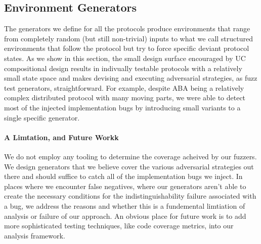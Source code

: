 \subsection{Environment Generators}
The generators we define for all the protocols produce environments that range
from completely random (but still non-trivial) inputs to what we call
structured environments that follow the protocol but try to force specific
deviant protocol states.  As we show in this section, the small design surface
encouraged by UC compositional design results in indivually testable protocols
with a relatively small state space and makes devising and executing
adversarial strategies, as fuzz test generators, straightforward.  For example,
despite ABA being a relatively complex distributed protocol with many moving
parts, we were able to detect most of the injected implementation bugs by
introducing small variants to a single specific generator.

\paragraph{A Limtation, and Future Workk}
We do not employ any tooling to determine the coverage acheived by our fuzzers.
We design generators that we believe cover the various adversarial strategies
out there and should suffice to catch all of the implementation bugs we inject.
In places where we encounter false negatives, where our generators aren't able
to create the necessary conditions for the indistinguishability failure
associated with a bug, we address the reasons and whether this is a fundemental
limtiation of analysis or failure of our approach.  An obvious place for future
work is to add more sophisticated testing techniques, like code coverage
metrics, into our analysis framework.

